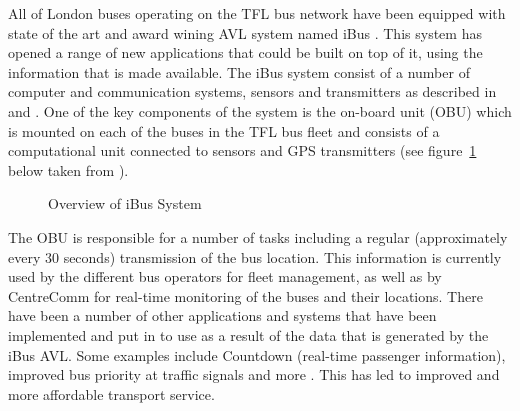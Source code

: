 
All of London buses operating on the TFL bus network have been equipped with state of the art and award wining \cite{ibusAward} AVL system named iBus \cite{ibus}. This system has opened a range of new applications that could be built on top of it, using the information that is made available. The iBus system consist of a number of computer and communication systems, sensors and transmitters as described in \cite{Hounsell201276} and \cite{eps354267}. One of the key components of the system is the on-board unit (OBU) which is mounted on each of the buses in the TFL bus fleet and consists of a computational unit connected to sensors and GPS transmitters (see figure~\ref{fig:iBusOverview} below taken from \cite{Hounsell201276}).
\begin{figure}[ht]
	\caption{Overview of iBus System \cite{Hounsell201276}}
	\label{fig:iBusOverview}
\end{figure}
The OBU is responsible for a number of tasks including a regular (approximately every 30 seconds) transmission of the bus location. This information is currently used by the different bus operators for fleet management, as well as by CentreComm for real-time monitoring of the buses and their locations. There have been a number of other applications and systems that have been implemented and put in to use as a result of the data that is generated by the iBus AVL. Some examples include Countdown (real-time passenger information), improved bus priority at traffic signals and more \cite{Hounsell201276}. This has led to improved and more affordable transport service.


